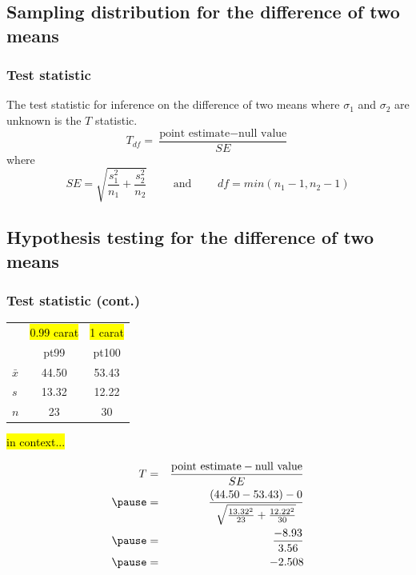 \documentclass[slidestop,compress,mathserif]{beamer}
\begin{document}

\subsection{Sampling distribution for the difference of two means}


\begin{frame}
\frametitle{Test statistic}

{The test statistic for inference on the difference of two means where $\sigma_1$ and $\sigma_2$ are unknown is the $T$ statistic.
\[ T_{df} = \frac{\text{point estimate} - \text{null value}}{SE} \]
where 
\[ SE = \sqrt{ \frac{s_1^2}{n_1} + \frac{s_2^2}{n_2} } \qquad \text{ and } \qquad df = min(n_1 - 1, n_2 - 1) \]
}


\end{frame}


\subsection{Hypothesis testing for the difference of two means}


\begin{frame}
\frametitle{Test statistic (cont.)}

{\small
\begin{center}
\begin{tabular}{l | c | c}
		& {\footnotesize \hl{0.99 carat}} &  {\footnotesize \hl{1 carat}}  \\
		& pt99	& pt100 \\
\hline
$\bar{x}$	& 44.50		& 53.43 \\
$s$		& 13.32		& 12.22 \\
$n$		& 23			& 30
\end{tabular}
\end{center}
}

\hl{in context...}

\pause

{\small
\begin{eqnarray*}
T &=& \frac{\text{point estimate} - \text{null value} }{SE} \\
\pause
&=& \frac{(44.50 - 53.43) - 0}{ \sqrt{\frac{13.32^2}{23} + \frac{12.22^2}{30} }} \\
\pause
&=& \frac{-8.93}{3.56} \\
\pause
&=& -2.508
\end{eqnarray*}
}

\end{frame}
\end{document}
